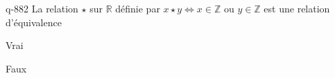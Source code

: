\begin{truefalse}{q-882}
La relation $\star$ sur $\mathbb R$ définie par $x\star y \iff x\in \mathbb Z$ ou $y\in \mathbb Z$ est une relation d'équivalence
\item Vrai
\item* Faux
\end{truefalse}


